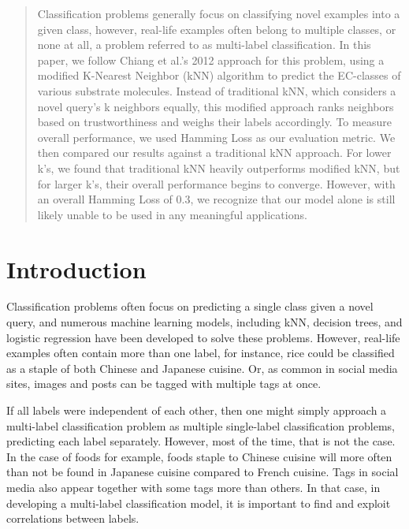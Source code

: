 \documentclass{article}
\begin{document}

\begin{abstract}
Classification problems generally focus on classifying novel examples into a given class, however, real-life examples often belong to multiple classes, or none at all, a problem referred to as multi-label classification. In this paper, we follow Chiang et al.'s 2012 approach for this problem, using a modified K-Nearest Neighbor (kNN) algorithm to predict the EC-classes of various substrate molecules. Instead of traditional kNN, which considers a novel query's k neighbors equally, this modified approach ranks neighbors based on trustworthiness and weighs their labels accordingly. To measure overall performance, we used Hamming Loss as our evaluation metric. We then compared our results against a traditional kNN approach. For lower k's, we found that traditional kNN heavily outperforms modified kNN, but for larger k's, their overall performance begins to converge. However, with an overall Hamming Loss of 0.3, we recognize that our model alone is still likely unable to be used in any meaningful applications.


\end{abstract}

\section{Introduction}
\label{introduction}

Classification problems often focus on predicting a single class given a novel query, and numerous machine learning models, including kNN, decision trees, and logistic regression have been developed to solve these problems. However, real-life examples often contain more than one label, for instance, rice could be classified as a staple of both Chinese and Japanese cuisine. Or, as common in social media sites, images and posts can be tagged with multiple tags at once. 

If all labels were independent of each other, then one might simply approach a multi-label classification problem as multiple single-label classification problems, predicting each label separately. However, most of the time, that is not the case. In the case of foods for example, foods staple to Chinese cuisine will more often than not be found in Japanese cuisine compared to French cuisine. Tags in social media also appear together with some tags more than others. In that case, in developing a multi-label classification model, it is important to find and exploit correlations between labels\cite{chiang}.
\end{document}
